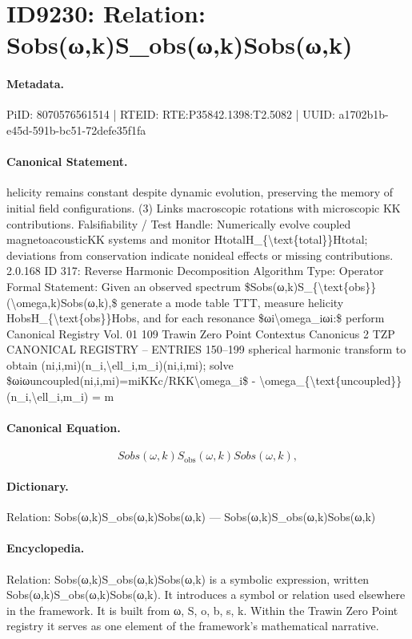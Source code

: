 \section*{ID9230: Relation: Sobs(ω,k)S\_obs(ω,k)Sobs(ω,k)}
\paragraph{Metadata.}
PiID: 8070576561514 | RTEID: RTE:P35842.1398:T2.5082 | UUID: a1702b1b-e45d-591b-bc51-72defe35f1fa

\paragraph{Canonical Statement.}
helicity remains constant despite dynamic evolution, preserving the memory of initial field configurations. (3) Links macroscopic rotations with microscopic KK contributions. Falsifiability / Test Handle: Numerically evolve coupled magnetoacousticKK systems and monitor HtotalH\_\{\textbackslash{}text\{total\}\}Htotal; deviations from conservation indicate nonideal effects or missing contributions. 2.0.168 ID 317: Reverse Harmonic Decomposition Algorithm Type: Operator Formal Statement: Given an observed spectrum \$Sobs(ω,k)S\_\{\textbackslash{}text\{obs\}\}(\textbackslash{}omega,k)Sobs(ω,k),\$ generate a mode table TTT, measure helicity HobsH\_\{\textbackslash{}text\{obs\}\}Hobs, and for each resonance \$ωi\textbackslash{}omega\_iωi:\$ perform Canonical Registry Vol. 01 109 Trawin Zero Point Contextus Canonicus 2 TZP CANONICAL REGISTRY – ENTRIES 150–199 spherical harmonic transform to obtain (ni,i,mi)(n\_i,\textbackslash{}ell\_i,m\_i)(ni,i,mi); solve \$ωiωuncoupled(ni,i,mi)=miKKc/RKK\textbackslash{}omega\_i\$ - \textbackslash{}omega\_\{\textbackslash{}text\{uncoupled\}\}(n\_i,\textbackslash{}ell\_i,m\_i) = m

\paragraph{Canonical Equation.}
\[
Sobs(ω,k)S_{\text{obs}}(\omega,k)Sobs(ω,k),
\]

\paragraph{Dictionary.}
Relation: Sobs(ω,k)S\_obs(ω,k)Sobs(ω,k) — Sobs(ω,k)S\_obs(ω,k)Sobs(ω,k)

\paragraph{Encyclopedia.}
Relation: Sobs(ω,k)S\_obs(ω,k)Sobs(ω,k) is a symbolic expression, written Sobs(ω,k)S\_obs(ω,k)Sobs(ω,k). It introduces a symbol or relation used elsewhere in the framework. It is built from ω, S, o, b, s, k. Within the Trawin Zero Point registry it serves as one element of the framework's mathematical narrative.
